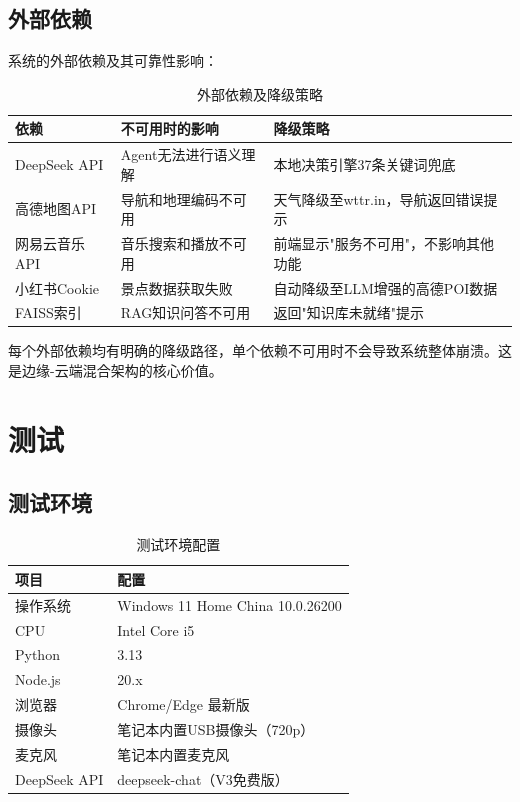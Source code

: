 \documentclass[a4paper]{article}
\begin{document}
\subsection{外部依赖}

系统的外部依赖及其可靠性影响：

\begin{table}[H]
  \centering
  \caption{外部依赖及降级策略}
  \label{tab:deps}
  \begin{tabular}{lll}
  \toprule
  依赖 & 不可用时的影响 & 降级策略 \\
  \midrule
  DeepSeek API & Agent无法进行语义理解 & 本地决策引擎37条关键词兜底 \\
  高德地图API & 导航和地理编码不可用 & 天气降级至wttr.in，导航返回错误提示 \\
  网易云音乐API & 音乐搜索和播放不可用 & 前端显示"服务不可用"，不影响其他功能 \\
  小红书Cookie & 景点数据获取失败 & 自动降级至LLM增强的高德POI数据 \\
  FAISS索引 & RAG知识问答不可用 & 返回"知识库未就绪"提示 \\
  \bottomrule
  \end{tabular}
\end{table}

每个外部依赖均有明确的降级路径，单个依赖不可用时不会导致系统整体崩溃。这是边缘-云端混合架构的核心价值。

\section{测试}

\subsection{测试环境}

\begin{table}[H]
  \centering
  \caption{测试环境配置}
  \label{tab:testenv}
  \begin{tabular}{ll}
  \toprule
  项目 & 配置 \\
  \midrule
  操作系统 & Windows 11 Home China 10.0.26200 \\
  CPU & Intel Core i5 \\
  Python & 3.13 \\
  Node.js & 20.x \\
  浏览器 & Chrome/Edge 最新版 \\
  摄像头 & 笔记本内置USB摄像头（720p）\\
  麦克风 & 笔记本内置麦克风 \\
  DeepSeek API & deepseek-chat（V3免费版）\\
  \bottomrule
  \end{tabular}
\end{table}
\end{document}
